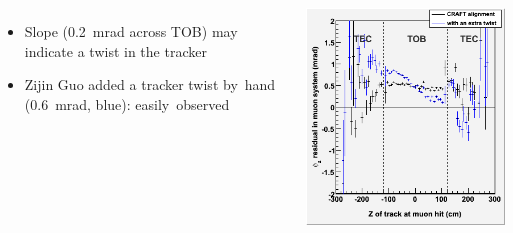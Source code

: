 \documentclass[compress]{beamer}
\begin{document}
\begin{frame}
\begin{columns}
\begin{itemize}
\item Slope (0.2~mrad across TOB) may indicate a twist in the tracker
\item Zijin Guo added a tracker twist \mbox{by hand\hspace{-0.5 cm}} (0.6~mrad, blue): \mbox{easily observed\hspace{-1 cm}}
\end{itemize}

\includegraphics[width=\linewidth]{phiresid_from_tracker_outer_twist2.png}
\end{columns}
\end{frame}
\end{document}
